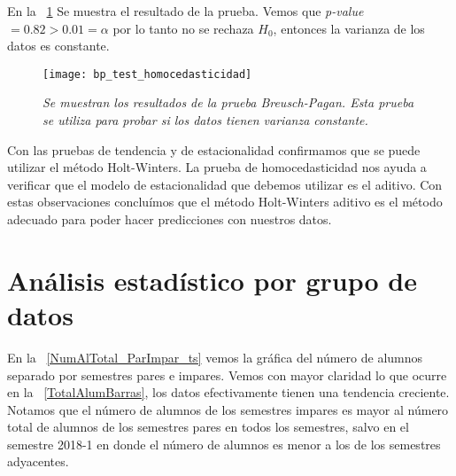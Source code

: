 En la \figurename{~\ref{bpTest_homocedasticidad}} Se muestra el resultado de la prueba. Vemos que \textit{p-value} $ = 0.82 > 0.01 = \alpha$ por lo tanto no se rechaza $H_{0}$, entonces la varianza de los datos es constante.


\begin{figure}[H]
\centering
\texttt{[image: bp\_test\_homocedasticidad]} %
\caption[\textit{Prueba Breusch-Pagan para homocedasticidad}]{\textit{Se muestran los resultados de la prueba Breusch-Pagan. Esta prueba se utiliza para probar si los datos tienen varianza constante.}}\label{bpTest_homocedasticidad}
\end{figure}


Con las pruebas de tendencia y de estacionalidad confirmamos que se puede utilizar el método Holt-Winters. La prueba de homocedasticidad nos ayuda a verificar que el modelo de estacionalidad que debemos utilizar es el aditivo. Con estas observaciones concluímos que el método Holt-Winters aditivo es el método adecuado para poder hacer predicciones con nuestros datos.

\section{Análisis estadístico por grupo de datos} \label{AE_x_GpoDeDatos}

En la \figurename{~\ref{NumAlTotal_ParImpar_ts}} vemos la gráfica del número de alumnos separado por semestres pares e impares. Vemos con mayor claridad lo que ocurre en la \figurename{~\ref{TotalAlumBarras}}, los datos efectivamente tienen una tendencia creciente. Notamos que el número de alumnos de los semestres impares es mayor al número total de alumnos de los semestres pares en todos los semestres, salvo en el semestre 2018-1 en donde el número de alumnos es menor a los de los semestres adyacentes.%



